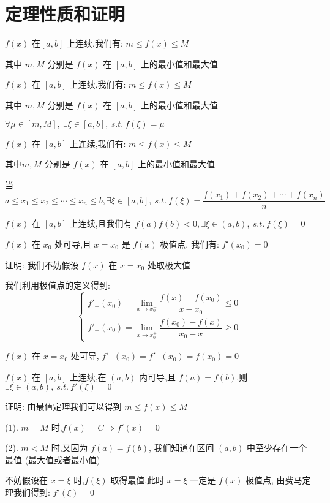 \section{定理性质和证明}
\begin{theorem}[有界和最值定理]

	$f(x)$ 在$[a,b]$ 上连续,我们有: $m\leq f(x)\leq M$

	其中 $m,M$ 分别是 $f(x)$ 在 $[a,b]$ 上的最小值和最大值
\end{theorem}
\begin{theorem}[介值定理]

	$f(x)$ 在 $[a,b]$ 上连续,我们有: $m\leq f(x)\leq M$

	其中 $m,M$ 分别是 $f(x)$ 在 $[a,b]$ 上的最小值和最大值

	$\forall \mu\in [m,M],\ \exists \xi\in[a,b],\ s.t.\ f(\xi)=\mu$
\end{theorem}
\begin{theorem}[平均值定理]

	$f(x)$ 在 $[a,b]$ 上连续,我们有: $m\leq f(x)\leq M$

	其中$m,M$ 分别是 $f(x)$ 在 $[a,b]$ 上的最小值和最大值

	当 $a\leq x_{1}\leq x_{2}\leq\cdots\leq x_{n}\leq b,\exists \xi\in[a,b],\ s.t.\ f(\xi)=\dfrac{f(x_{1})+f(x_{2})+\cdots+f(x_{n})}{n}$
\end{theorem}
\begin{theorem}[零点定理]

	$f(x)$ 在 $[a,b]$ 上连续,且我们有 $f(a)f(b)<0,\exists \xi\in(a,b),\ s.t.\ f(\xi)=0$
\end{theorem}
\begin{theorem}[费马定理]

	$f(x)$ 在 $x_{0}$ 处可导,且 $x=x_{0}$ 是 $f(x)$ 极值点, 我们有: $f'(x_{0})=0$

	证明: 我们不妨假设 $f(x)$ 在 $x=x_{0}$ 处取极大值

	我们利用极值点的定义得到:
	$$ \left\lbrace
		\begin{array}{l}
			f'_{-}(x_{0})=\lim\limits_{x\rightarrow x_{0}^{-}}\dfrac{f(x)-f(x_{0})}{x-x_{0}}\leq 0 \\
			f'_{+}(x_{0})=\lim\limits_{x\rightarrow x_{0}^{+}}\dfrac{f(x_{0})-f(x)}{x_{0}-x}\geq 0
		\end{array}
		\right. $$

	$f(x)$ 在 $x=x_{0}$ 处可导, $f'_{+}(x_{0})=f'_{-}(x_{0})=f(x_{0})=0$
\end{theorem}
\begin{theorem}[罗尔定理]

	$f(x)$ 在 $[a,b]$ 上连续,在 $(a,b)$ 内可导,且 $f(a)=f(b)$,则 $\exists \xi\in(a,b),\ s.t.\ f'(\xi)=0$

	证明: 由最值定理我们可以得到 $m\leq f(x)\leq M$

	(1). $m=M$ 时,$f(x) = C \Rightarrow f'(x)=0$

	(2). $m<M$ 时,又因为 $f(a)=f(b)$, 我们知道在区间 $(a,b)$ 中至少存在一个最值 (最大值或者最小值)

	不妨假设在 $x=\xi$ 时,$f(\xi)$ 取得最值,此时 $x=\xi$ 一定是 $f(x)$ 极值点, 由费马定理我们得到: $f'(\xi)=0$

\end{theorem}

